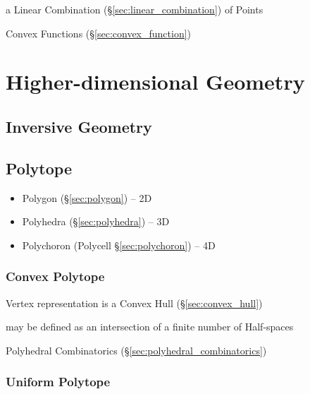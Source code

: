 a Linear Combination (\S\ref{sec:linear_combination}) of Points

\fist Convex Functions (\S\ref{sec:convex_function})



\section{Higher-dimensional Geometry}\label{sec:higher_geometry}

\subsection{Inversive Geometry}\label{sec:inversive_geometry}

\subsection{Polytope}\label{sec:polytope}

\begin{itemize}
  \item Polygon (\S\ref{sec:polygon}) -- 2D
  \item Polyhedra (\S\ref{sec:polyhedra}) -- 3D
  \item Polychoron (Polycell \S\ref{sec:polychoron}) -- 4D
\end{itemize}



\subsubsection{Convex Polytope}\label{sec:convex_polytope}

Vertex representation is a Convex Hull (\S\ref{sec:convex_hull})

may be defined as an intersection of a finite number of Half-spaces

\fist Polyhedral Combinatorics (\S\ref{sec:polyhedral_combinatorics})



\subsubsection{Uniform Polytope}\label{sec:uniform_polytope}

